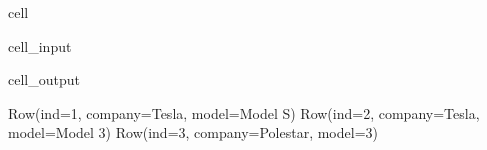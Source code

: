 \documentclass[letterpaper,10pt,english]{jupyterBook}
\begin{document}
\begin{sphinxuseclass}{cell}\begin{sphinxVerbatimInput}

\begin{sphinxuseclass}{cell_input}
\begin{sphinxVerbatim}[commandchars=\\\{\}]
  
   
\end{sphinxVerbatim}

\end{sphinxuseclass}\end{sphinxVerbatimInput}
\begin{sphinxVerbatimOutput}

\begin{sphinxuseclass}{cell_output}
\begin{sphinxVerbatim}[commandchars=\\\{\}]
Row(ind=1, company=\PYGZsq{}Tesla\PYGZsq{}, model=\PYGZsq{}Model S\PYGZsq{})
Row(ind=2, company=\PYGZsq{}Tesla\PYGZsq{}, model=\PYGZsq{}Model 3\PYGZsq{})
Row(ind=3, company=\PYGZsq{}Polestar\PYGZsq{}, model=\PYGZsq{}3\PYGZsq{})
\end{sphinxVerbatim}

\end{sphinxuseclass}\end{sphinxVerbatimOutput}

\end{sphinxuseclass}
\end{document}
